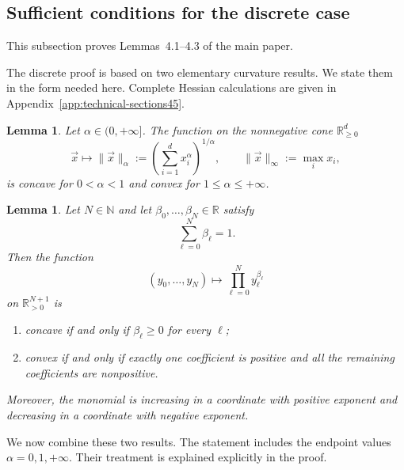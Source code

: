 \documentclass[aps,pra,11pt,onecolumn,nofootinbib,tightenlines]{revtex4-2}
\newtheorem{lemma}[theorem]{Lemma}
\theoremstyle{definition}
\begin{document}
\subsection{Sufficient conditions for the discrete case}

This subsection proves Lemmas~4.1--4.3 of the main paper.

The discrete proof is based on two elementary curvature results. We state them in the form needed here. Complete Hessian calculations are given in Appendix~\ref{app:technical-sections45}.

\begin{lemma}
\label{lem:power-mean-curvature}
Let $\alpha\in(0,+\infty]$. The function on the nonnegative cone
$\mathbb R^d_{\geq0}$
\begin{equation}
 \vec x\longmapsto
 \|\vec x\|_\alpha
 :=\left(\sum_{i=1}^d x_i^\alpha\right)^{1/\alpha},
 \qquad
 \|\vec x\|_\infty:=\max_i x_i,
 \label{eq:power-mean-function}
\end{equation}
 is concave for $0<\alpha<1$ and convex for $1\leq\alpha\leq+\infty$.
\end{lemma}

\begin{lemma}
\label{lem:monomial-curvature}
Let $N\in\mathbb N$ and let $\beta_0,\ldots,\beta_N\in\mathbb R$ satisfy
\begin{equation}
 \sum_{\ell=0}^N\beta_\ell=1.
 \label{eq:beta-sum-one}
\end{equation}
Then the function
\begin{equation}
 (y_0,\ldots,y_N)\longmapsto
 \prod_{\ell=0}^N y_\ell^{\beta_\ell}
 \label{eq:outer-monomial}
\end{equation}
 on $\mathbb R_{>0}^{N+1}$ is
\begin{enumerate}
 \item concave if and only if $\beta_\ell\geq0$ for every $\ell$;
 \item convex if and only if exactly one coefficient is positive and all the remaining coefficients are nonpositive.
\end{enumerate}
Moreover, the monomial is increasing in a coordinate with positive exponent and decreasing in a coordinate with negative exponent.
\end{lemma}

We now combine these two results. The statement includes the endpoint values $\alpha=0,1,+\infty$. Their treatment is explained explicitly in the proof.
\end{document}
